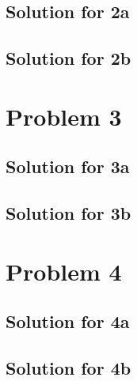 \documentclass[a4paper,fleqn,12pt]{article}
\begin{document}
\subsection{Solution for 2a}
\subsection{Solution for 2b}
\newpage

\section{Problem 3}
\subsection{Solution for 3a}
\subsection{Solution for 3b}
\newpage

\section{Problem 4}
\subsection{Solution for 4a}
\subsection{Solution for 4b}
\end{document}
